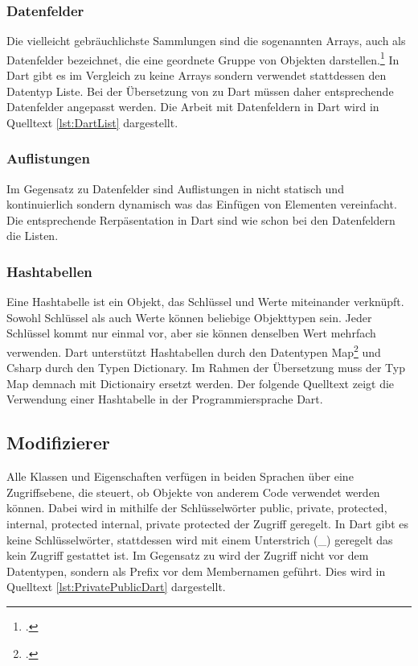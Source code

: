 \subsubsection{Datenfelder}
Die vielleicht gebräuchlichste Sammlungen sind die sogenannten Arrays, auch als Datenfelder bezeichnet,  die eine geordnete Gruppe von Objekten darstellen.\footcite[Vgl.][S. 110f]{Kühnel2019}  In Dart gibt es im Vergleich zu \Csharp keine Arrays sondern verwendet stattdessen den Datentyp Liste.  Bei der Übersetzung von \Csharp zu Dart müssen daher entsprechende Datenfelder angepasst werden. Die Arbeit mit Datenfeldern in Dart wird in Quelltext \ref{lst:DartList} dargestellt.



\subsubsection{Auflistungen}
Im Gegensatz zu Datenfelder sind Auflistungen in \Csharp nicht statisch und kontinuierlich sondern dynamisch was das Einfügen von Elementen vereinfacht.  Die entsprechende Rerpäsentation in Dart sind wie schon bei den Datenfeldern die Listen.

\subsubsection{Hashtabellen}
Eine Hashtabelle ist ein Objekt, das Schlüssel und Werte miteinander verknüpft.  Sowohl Schlüssel als auch Werte können beliebige Objekttypen sein. Jeder Schlüssel kommt nur einmal vor, aber sie können denselben Wert mehrfach verwenden. Dart unterstützt Hashtabellen durch den Datentypen Map\footcite[Vgl. ][Abgerufen am \today]{GoogleFlutterTour2020} und Csharp durch den Typen Dictionary.  Im Rahmen der Übersetzung muss der Typ Map demnach mit Dictionairy ersetzt werden.  Der folgende Quelltext zeigt die Verwendung einer Hashtabelle in der Programmiersprache Dart.



\subsection{Modifizierer}

Alle Klassen und Eigenschaften verfügen in beiden Sprachen über eine Zugriffsebene,  die steuert, ob  Objekte von anderem Code verwendet werden können.  Dabei wird in \Csharp  mithilfe der Schlüsselwörter  public,  private,  protected,  internal,  protected internal,  private protected der Zugriff geregelt.  In Dart gibt es keine Schlüsselwörter, stattdessen wird mit einem Unterstrich (\_) geregelt das kein Zugriff gestattet ist.  Im Gegensatz zu \Csharp wird der Zugriff nicht vor dem Datentypen, sondern als Prefix vor dem Membernamen geführt.  Dies wird in Quelltext \ref{lst:PrivatePublicDart}  dargestellt. 

